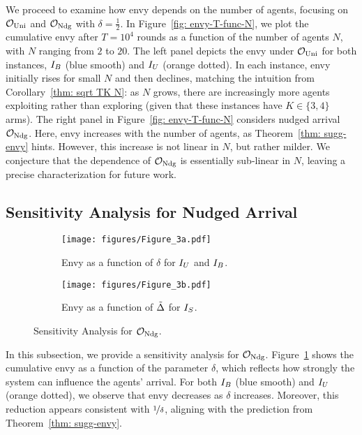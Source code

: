 We proceed to examine how envy depends on the number of agents, focusing on $\mathcal O_{\textnormal{Uni}}$ and $\mathcal O_{\textnormal{Ndg}}$ with $\delta = \frac{1}{2}$. In Figure~\ref{fig: envy-T-func-N}, we plot the cumulative envy after $T = 10^4$ rounds as a function of the number of agents $N$, with $N$ ranging from $2$ to $20$. The left panel depicts the envy under $\mathcal O_{\textnormal{Uni}}$ for both instances, $I_B$ (blue smooth) and $I_U$ (orange dotted). In each instance, envy initially rises for small $N$ and then declines, matching the intuition from Corollary~\ref{thm: sqrt TK N}: as $N$ grows, there are increasingly more agents exploiting rather than exploring (given that these instances have $K\in\{3,4\}$ arms). The right panel in Figure~\ref{fig: envy-T-func-N} considers nudged arrival $\mathcal O_{\textnormal{Ndg}}$. Here, envy increases with the number of agents, as Theorem~\ref{thm: sugg-envy} hints. However, this increase is not linear in $N$, but rather milder. We conjecture that the dependence of $\mathcal O_{\textnormal{Ndg}}$ is essentially sub-linear in $N$, leaving a precise characterization for future work.
\subsection{Sensitivity Analysis for Nudged Arrival}\label{subsec:nudge sensitive}
\begin{figure}
    \centering
    \begin{subfigure}{0.49\textwidth}
        \texttt{[image: figures/Figure\_3a.pdf]}
        \caption{Envy as a function of $\delta$ for $I_U$ and $I_B$.
        }\label{fig: envy_at_T_as_func_delta}
    \end{subfigure}
    \hfill
    \begin{subfigure}{0.49\textwidth}
        \texttt{[image: figures/Figure\_3b.pdf]}
        \caption{Envy as a function of $\tilde\Delta$ for $I_S$.
        }\label{fig: envy_at_T_delta_func_of_T}
    \end{subfigure}
    \caption{Sensitivity Analysis for $\mathcal O_{\textnormal{Ndg}}$.}
\end{figure}
In this subsection, we provide a sensitivity analysis for $\mathcal O_{\textnormal{Ndg}}$. Figure~\ref{fig: envy_at_T_as_func_delta} shows the cumulative envy as a function of the parameter $\delta$, which reflects how strongly the system can influence the agents' arrival. 
For both $I_B$ (blue smooth) and $I_U$ (orange dotted), we observe that envy decreases as $\delta$ increases. 
Moreover, this reduction appears consistent with $\nicefrac{1}{\delta}$, aligning with the prediction from Theorem~\ref{thm: sugg-envy}.

